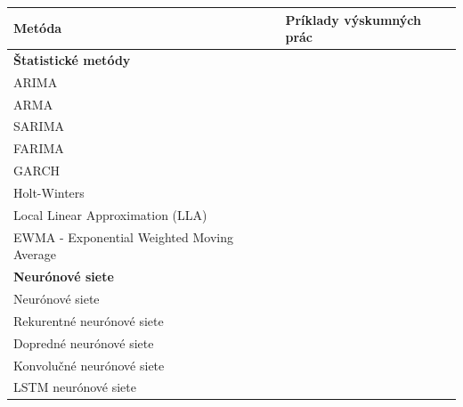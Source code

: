 \documentclass[thesismargins, thesislinespacing, openright, upjsfrontpage]{rnthesis}
\begin{document}
\begin{table}[]
    \centering
    \begin{tabular}{ | p{7cm} | p{7cm} | }
         \hline \textbf{Metóda} & \textbf{Príklady výskumných prác} \\

         \hline \multicolumn{2}{l}{\textbf{Štatistické metódy}} \\
         \hline ARIMA & \cite{madan2018predicting,papagiannaki2005long,condon2008analysis,roumani2015time,tang2018disclosure,tang2017big,pokhrel2017cybersecurity,werner2017time,cortez2012multi} \\
         \hline ARMA & \cite{wei2012intrusion,sang2002predictability} \\
         \hline SARIMA & \cite{tang2016exploiting,condon2008analysis,roumani2015time,tang2018disclosure} \\
         \hline FARIMA & \cite{zhan2015predicting} \\
         \hline GARCH & \cite{tang2016exploiting,tang2018disclosure,tang2017big} \\
         \hline Holt-Winters & \cite{cortez2012multi,roumani2015time} \\
         \hline Local Linear Approximation (LLA) & \cite{hasegawa2001applications} \\
         \hline EWMA - Exponential Weighted Moving Average & \cite{soldo2011blacklisting} \\

         
         
         \hline \multicolumn{2}{l}{\textbf{Neurónové siete}} \\
         \hline Neurónové siete & \cite{Leau2015,wang2008internet} \\
         \hline Rekurentné neurónové siete & \cite{madan2018predicting,fang2019deep} \\
         \hline Dopredné neurónové siete & \cite{cortez2012multi,pokhrel2017cybersecurity} \\
         \hline Konvolučné neurónové siete & \cite{millar2019using} \\
         \hline LSTM neurónové siete & \cite{fang2019deep} \\
         

\end{tabular}
\end{table}
\end{document}
